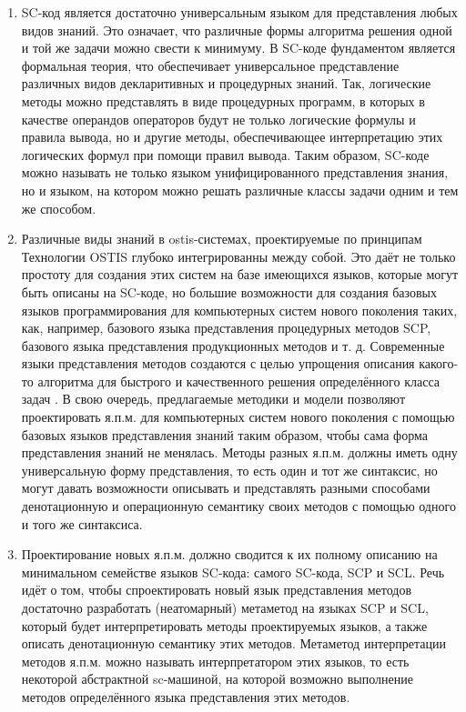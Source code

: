 \begin{enumerate}
    \item SC-код является достаточно универсальным языком для представления любых видов знаний. Это означает, что различные формы алгоритма решения одной и той же задачи можно свести к минимуму. В SC-коде фундаментом является формальная теория, что обеспечивает универсальное представление различных видов декларитивных и процедурных знаний. Так, логические методы можно представлять в виде процедурных программ, в которых в качестве операндов операторов будут не только логические формулы и правила вывода, но и другие методы, обеспечивающее интерпретацию этих логических формул при помощи правил вывода. Таким образом, SC-коде можно называть не только языком унифицированного представления знания, но и языком, на котором можно решать различные классы задачи одним и тем же способом.
    \item Различные виды знаний в ostis-системах, проектируемые по принципам Технологии OSTIS глубоко интегрированны между собой. Это даёт не только простоту для создания этих систем на базе имеющихся языков, которые могут быть описаны на SC-коде, но большие возможности для создания базовых языков программирования для компьютерных систем нового поколения таких, как, например, базового языка представления процедурных методов SCP, базового языка представления продукционных методов и т. д. Современные языки представления методов создаются с целью упрощения описания какого-то алгоритма для быстрого и качественного решения определённого класса задач \cite{Benri2000}. В свою очередь, предлагаемые методики и модели позволяют проектировать я.п.м. для компьютерных систем нового поколения с помощью базовых языков представления знаний таким образом, чтобы сама форма представления знаний не менялась. Методы разных я.п.м. должны иметь одну универсальную форму представления, то есть один и тот же синтаксис, но могут давать возможности описывать и представлять разными способами денотационную и операционную семантику своих методов с помощью одного и того же синтаксиса.
    \item Проектирование новых я.п.м. должно сводится к их полному описанию на минимальном семействе языков SC-кода: самого SC-кода, SCP и SCL. Речь идёт о том, чтобы спроектировать новый язык представления методов достаточно разработать (неатомарный) метаметод на языках SCP и SCL, который будет интерпретировать методы проектируемых языков, а также описать денотационную семантику этих методов. Метаметод интерпретации методов я.п.м. можно называть интерпретатором этих языков, то есть некоторой абстрактной sc-машиной, на которой возможно выполнение методов определённого языка представления этих методов.
\end{enumerate}

